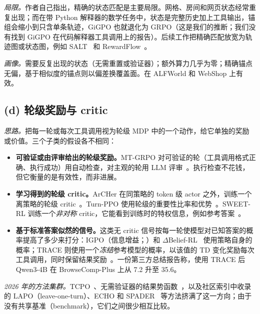 \emph{局限。}作者自己指出，精确的状态匹配是主要局限。网格、房间和网页状态经常重复出现；而在带 Python 解释器的数学任务中，状态是完整历史加上工具输出，锚组会缩小到只含单条轨迹，GiGPO 也就退化为 GRPO（这是我们的推断；我们没有找到 GiGPO 在代码解释器工具调用上的报告）。后续工作把精确匹配放宽为轨迹图或状态图，例如 SALT~\citep{salt2026step}\unverified{} 和 RewardFlow~\citep{rewardflow2026topology}\unverified。

\emph{画像。}需要反复出现的状态（无需重置或验证器）；额外算力几乎为零；精确锚点无偏，基于相似度的锚点则以偏差换覆盖面。在 ALFWorld 和 WebShop 上有效。

\subsection{(d) 轮级奖励与 critic}\label{sec:tax-turn}

\emph{思路。}把每一轮或每次工具调用视为轮级 MDP 中的一个动作，给它单独的奖励或价值。三个子类的假设各不相同：
\begin{itemize}
  \item \textbf{可验证或由评审给出的轮级奖励。}MT-GRPO 对可验证的轮（工具调用格式正确、执行成功）用自动检查，对主观的轮用 LLM 评审~\citep{wei2025reinforcing}\unverified。执行检查不花钱，但它衡量的是有效性，而非进展。
  \item \textbf{学习得到的轮级 critic。}ArCHer 在同策略的 token 级 actor 之外，训练一个离策略的轮级 critic~\citep{zhou2024archer}\unverified。Turn-PPO 使用轮级的重要性比率和优势~\citep{turnppo2025turn}\unverified。SWEET-RL 训练一个\emph{非对称} critic，它能看到训练时的特权信息，例如参考答案~\citep{zhou2025sweet}\unverified。
  \item \textbf{基于标准答案似然的信号。}这类无 critic 信号按每一轮使模型对已知答案的概率提高了多少来打分：IGPO（信息增益；\citealp{igpo2025information}\unverified）和 $\Delta$Belief-RL~\citep{deltabelief2026intrinsic}\unverified{} 使用策略自身的概率；TRACE 则使用一个\emph{冻结}参考模型的概率，以该值的 TD 变化奖励每次工具调用，同时保留结果奖励~\citep{trace2026turn}。一份第三方总结报告称，使用 TRACE 后 Qwen3-4B 在 BrowseComp-Plus 上从 7.2 升至 35.6\unverified。
\end{itemize}

\emph{2026 年的方法集群。}TCPO~\citep{tcpo2026turn}、无需验证器的结果势函数~\citep{sop2026self}，以及社区索引中收录的 LAPO（leave-one-turn）、ECHO 和 SPADER~\citep{thinkwee2026agentsmeetrl}\unverified{} 等方法挤满了这一方向；由于没有共享基准（benchmark），它们之间很少相互比较。

